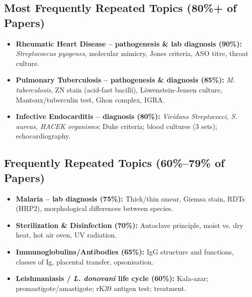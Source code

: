 \documentclass[11pt,a4paper]{article}
\begin{document}
\subsection{Most Frequently Repeated Topics (80\%+ of Papers)}
\begin{itemize}[leftmargin=*]
    \item \textbf{Rheumatic Heart Disease -- pathogenesis \& lab diagnosis (90\%):} \textit{Streptococcus pyogenes}, molecular mimicry, Jones criteria, ASO titre, throat culture.
    \item \textbf{Pulmonary Tuberculosis -- pathogenesis \& diagnosis (85\%):} \textit{M. tuberculosis}, ZN stain (acid-fast bacilli), Löwenstein-Jensen culture, Mantoux/tuberculin test, Ghon complex, IGRA.
    \item \textbf{Infective Endocarditis -- diagnosis (80\%):} \textit{Viridans Streptococci, S. aureus, HACEK organisms}; Duke criteria; blood cultures (3 sets); echocardiography.
\end{itemize}

\subsection{Frequently Repeated Topics (60\%--79\% of Papers)}
\begin{itemize}[leftmargin=*]
    \item \textbf{Malaria -- lab diagnosis (75\%):} Thick/thin smear, Giemsa stain, RDTs (HRP2), morphological differences between species.
    \item \textbf{Sterilization \& Disinfection (70\%):} Autoclave principle, moist vs. dry heat, hot air oven, UV radiation.
    \item \textbf{Immunoglobulins/Antibodies (65\%):} IgG structure and functions, classes of Ig, placental transfer, opsonisation.
    \item \textbf{Leishmaniasis / \textit{L. donovani} life cycle (60\%):} Kala-azar; promastigote/amastigote; rK39 antigen test; treatment.
\end{itemize}
\end{document}
